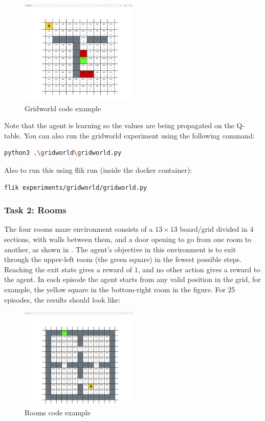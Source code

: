 \begin{figure}[h]
    \centering
    \includegraphics[width=0.5\textwidth]{figures/gridworld_example.png}
    \caption{Gridworld code example}
    \label{fig:gridworld-code-example}
\end{figure}

Note that the agent is learning so the values are being propagated on the Q-table. You can also run 
the gridworld experiment using the following command:

\begin{lstlisting}[language=bash]
python3 .\gridworld\gridworld.py
\end{lstlisting}

Also to run this using flik run (inside the docker container):

\begin{lstlisting}[language=bash]
flik experiments/gridworld/gridworld.py
\end{lstlisting}

\subsubsection{Task 2: Rooms}

The four rooms maze environment consists of a $13\times 13$ board/grid divided in $4$ sections, with walls 
between them, and a door opening to go from one room to another, as shown in . 
The agent's objective in this environment is to exit through the upper-left room (the green square) 
in the fewest possible steps. Reaching the exit state gives a reward of $1$, and no other action gives a 
reward to the agent. In each episode the agent starts from any valid position in the grid, for example, 
the yellow square in the bottom-right room in the figure. For $25$ episodes, the results should look like:

\begin{figure}[h]
    \centering
    \includegraphics[width=0.5\textwidth]{figures/rooms_example.png}
    \caption{Rooms code example}
    \label{fig:rooms-code-example}
\end{figure}


